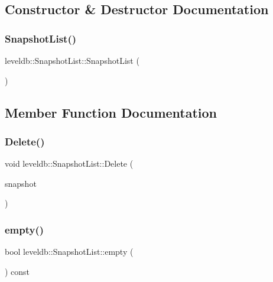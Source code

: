 \subsection{Constructor \& Destructor Documentation}
\mbox{\label{classleveldb_1_1_snapshot_list_a8e312959c2c2e2e64e9bb7eaca2459ae}} 
\subsubsection{\texorpdfstring{SnapshotList()}{SnapshotList()}}
{\footnotesize\ttfamily leveldb\+::\+Snapshot\+List\+::\+Snapshot\+List (\begin{DoxyParamCaption}{ }\end{DoxyParamCaption})\hspace{0.3cm}{\ttfamily [inline]}}



\subsection{Member Function Documentation}
\mbox{\label{classleveldb_1_1_snapshot_list_a806aa482c5a66c080b75b897446f1dba}} 
\subsubsection{\texorpdfstring{Delete()}{Delete()}}
{\footnotesize\ttfamily void leveldb\+::\+Snapshot\+List\+::\+Delete (\begin{DoxyParamCaption}\item[{const \mbox{\hyperlink{classleveldb_1_1_snapshot_impl}{Snapshot\+Impl}} $\ast$}]{snapshot }\end{DoxyParamCaption})\hspace{0.3cm}{\ttfamily [inline]}}

\mbox{\label{classleveldb_1_1_snapshot_list_a1db6b1cbcd79669168052e088e8af84e}} 
\subsubsection{\texorpdfstring{empty()}{empty()}}
{\footnotesize\ttfamily bool leveldb\+::\+Snapshot\+List\+::empty (\begin{DoxyParamCaption}{ }\end{DoxyParamCaption}) const\hspace{0.3cm}{\ttfamily [inline]}}

